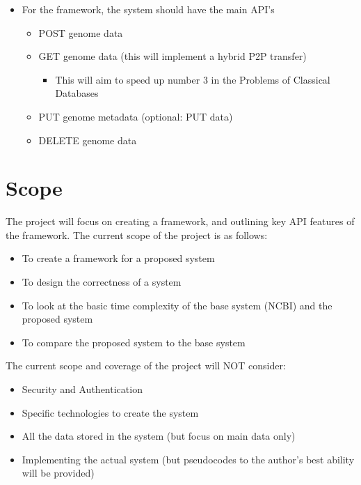 \documentclass[acmsmall]{acmart}
\begin{document}
\begin{itemize}
    \item For the framework, the system should have the main API’s 
    \begin{itemize}
        \item POST genome data
        \item GET genome data (this will implement a hybrid P2P transfer)
        \begin{itemize}
            \item This will aim to speed up number 3 in the Problems of Classical Databases
        \end{itemize}
        \item PUT genome metadata (optional: PUT data)
        \item DELETE genome data
    \end{itemize}
\end{itemize}


\section{Scope}

The project will focus on creating a framework, and outlining key API features of the framework. The current scope of the project is as follows:

\begin{itemize}
    \item To create a framework for a proposed system
    \item To design the correctness of a system
    \item To look at the basic time complexity of the base system (NCBI) and the proposed system
    \item To compare the proposed system to the base system

\end{itemize}

The current scope and coverage of the project will NOT consider:

\begin{itemize}
    \item Security and Authentication 
    \item Specific technologies to create the system
    \item All the data stored in the system (but focus on main data only)
    \item Implementing the actual system (but pseudocodes to the author's best ability will be provided)
\end{itemize}
\end{document}
